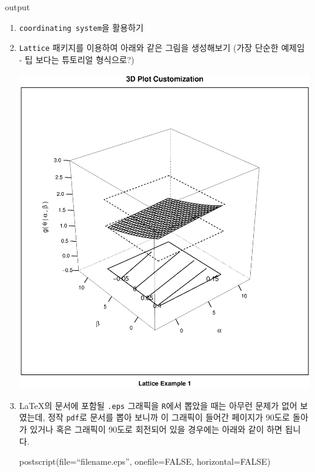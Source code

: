 \documentclass{book}
\begin{document}
\begin{Schunk}
\begin{Soutput}
output
\end{Soutput}
\end{Schunk}

\begin{enumerate}

\item \texttt{coordinating system}을 활용하기

\item \texttt{Lattice} 패키지를 이용하여 아래와 같은 그림을 생성해보기 (가장 단순한 예제임 - 팁 보다는 튜토리얼 형식으로?)

\includegraphics{./img/lattice-fig.eps}


\item \LaTeX 의 문서에 포함될 \texttt{.eps} 그래픽을 \texttt{R}에서 뽑았을 때는 아무런 문제가 없어 보였는데, 정작 \texttt{pdf}로 문서를 뽑아 보니까 이 그래픽이 들어간 페이지가 90도로 돌아가 있거나 혹은 그래픽이 90도로 회전되어 있을 경우에는 아래와 같이 하면 됩니다.

\begin{Schunk}
 \begin{Sinput}
  postscript(file=``filename.eps'', onefile=FALSE, horizontal=FALSE)
 \end{Sinput}
\end{Schunk}


\end{enumerate}
\end{document}
